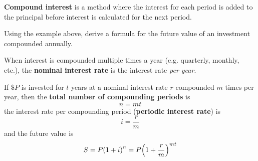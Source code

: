 \documentclass[../mathNotesPreamble]{subfiles}
\begin{document}
    \begin{minipage}{0.5\linewidth}
      \begin{center}
      \end{center}
    \end{minipage}

    \begin{defn*}
      \textbf{Compound interest} is a method where the interest for each period is added to the principal before interest is calculated for the next period.
    \end{defn*}
    \vspace*{0.5\baselineskip}

    \begin{ex*}
      Using the example above, derive a formula for the future value of an investment compounded annually.
    \end{ex*}
    \pagebreak
    
    \begin{defn*}
      When interest is compounded multiple times a year (e.g. quarterly, monthly, etc.), the \textbf{nominal interest rate} is the interest rate \emph{per year}.\newline

      If $\$P$ is invested for $t$ years at a nominal interest rate $r$ compounded $m$ times per year, then the \textbf{total number of compounding periods} is
        \[n=mt\]
      the interest rate per compounding period (\textbf{periodic interest rate}) is
        \[i=\frac{r}{m}\]
      and the future value is
        \[S=P{\left(1+i\right)}^n=P{\left(1+\frac{r}{m}\right)}^{mt}\]
    \end{defn*}
    
\end{document}
